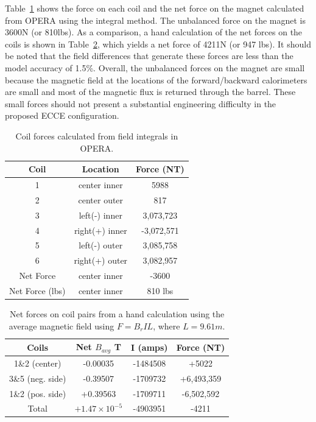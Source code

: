 Table~\ref{tab:opera_forces} shows the force on each coil and the net force on the magnet calculated from OPERA using the integral method.  The unbalanced force on the magnet is 3600N (or 810lbs).  As a comparison, a hand calculation of the net forces on the coils is shown in Table~\ref{tab:hand_forces}, which yields a net force of 4211N (or 947 lbs).  It should be noted that the field differences that generate these forces are less than the model accuracy of 1.5\%. Overall, the unbalanced forces on the magnet are small because the magnetic field at the locations of the forward/backward calorimeters are small and most of the magnetic flux is returned through the barrel.  These small forces should not present a substantial engineering difficulty in the proposed ECCE configuration. 

\begin{table}
\centering
\begin{tabular}{c|c|c}
Coil & Location & Force (NT) \\
\hline
1 & center inner & 5988 \\
2 & center outer & 817 \\
3 & left(-) inner & 3,073,723 \\
4 & right(+) inner & -3,072,571 \\
5 & left(-) outer & 3,085,758 \\
6 & right(+) outer & 3,082,957 \\
\hline
Net Force & center inner & -3600 \\
Net Force (lbs) & center inner & 810 lbs \\
\end{tabular}
\caption{Coil forces calculated from field integrals in OPERA.}
\label{tab:opera_forces}
\end{table}

\begin{table}
\centering
\begin{tabular}{c|c|c|c}
Coils & Net $B_{avg}$ T & I (amps) & Force (NT) \\
\hline
1\&2 (center) & -0.00035 & -1484508 & +5022 \\
3\&5 (neg. side) & -0.39507 & -1709732 & +6,493,359 \\
1\&2 (pos. side) & +0.39563 & -1709711 & -6,502,592 \\
\hline
Total & $+1.47\times10^{-5}$ & -4903951 & -4211 \\
\end{tabular}
\caption{Net forces on coil pairs from a hand calculation using the average magnetic field using $F=B_{r}IL$, where $L=9.61m$.}
\label{tab:hand_forces}
\end{table}
